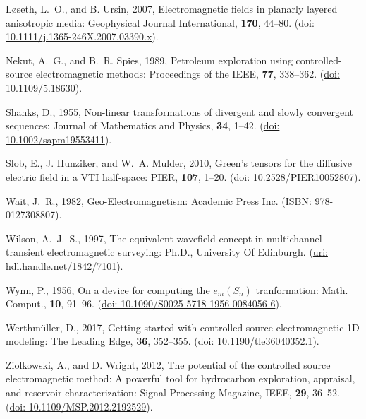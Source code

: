 \documentclass[manuscript,revised]{geophysics}
\begin{document}
\begin{thebibliography}{}
Løseth, L.~O., and B. Ursin, 2007, Electromagnetic fields in planarly layered
  anisotropic media: Geophysical Journal International, {\bf 170}, 44--80.
\newblock (\href{http://dx.doi.org/10.1111/j.1365-246X.2007.03390.x}{doi:
  10.1111/j.1365-246X.2007.03390.x}).

Nekut, A.~G., and B.~R. Spies, 1989, Petroleum exploration using
  controlled-source electromagnetic methods: Proceedings of the IEEE, {\bf 77},
  338--362.
\newblock
  (\href{http://ieeexplore.ieee.org/lpdocs/epic03/wrapper.htm?arnumber=18630}{doi:
  10.1109/5.18630}).

Shanks, D., 1955, Non-linear transformations of divergent and slowly
  convergent sequences: Journal of Mathematics and Physics, {\bf 34}, 1--42.
\newblock (\href{http://dx.doi.org/10.1002/sapm19553411}{doi:
  10.1002/sapm19553411}).

Slob, E., J. Hunziker, and W.~A. Mulder, 2010, Green's tensors for the
  diffusive electric field in a {VTI} half-space: PIER, {\bf 107}, 1--20.
\newblock (\href{http://dx.doi.org/10.2528/PIER10052807}{doi:
  10.2528/PIER10052807}).

Wait, J.~R., 1982, Geo-{E}lectromagnetism: Academic Press Inc.
\newblock ({I}SBN: 978-0127308807).

Wilson, A.~J.~S., 1997, The equivalent wavefield concept in multichannel
transient electromagnetic surveying: Ph.D., University Of Edinburgh.
\newblock (\href{http://hdl.handle.net/1842/7101}{uri:
hdl.handle.net/1842/7101}).

Wynn, P., 1956, {On a device for computing the $e_m(S_n)$ tranformation}:
  Math. Comput., {\bf 10}, 91--96.
\newblock (\href{http://dx.doi.org/10.1090/S0025-5718-1956-0084056-6}{doi:
  10.1090/S0025-5718-1956-0084056-6}).

Werthmüller, D., 2017, Getting started with controlled-source electromagnetic
1D modeling: The Leading Edge, {\bf 36}, 352--355.
\newblock (\href{http://dx.doi.org/10.1190/tle36040352.1}{doi:
  10.1190/tle36040352.1}).

Ziolkowski, A., and D. Wright, 2012, The potential of the controlled source
  electromagnetic method: A powerful tool for hydrocarbon exploration,
  appraisal, and reservoir characterization: Signal Processing Magazine, IEEE,
  {\bf 29}, 36--52.
\newblock (\href{http://dx.doi.org/10.1109/MSP.2012.2192529}{doi:
  10.1109/MSP.2012.2192529}).

\end{thebibliography}
\end{document}
